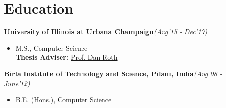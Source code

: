\section{\mysidestyle Education}
\vspace{0mm}
\textbf{\href{https://cs.illinois.edu/}{University of Illinois at Urbana Champaign}}\hfill {\small\textit{(Aug'15 - Dec'17)}}
\begin{itemize}[leftmargin=*]\compresslist
    \item[]M.S., Computer Science 
    \\
\textbf{Thesis Adviser:} \href{http://www.cis.upenn.edu/~danroth/}{Prof. Dan Roth}
\end{itemize}
\vspace{-0.2cm}
\textbf{\href{http://www.bits-pilani.ac.in/}{Birla Institute of Technology and Science, Pilani, India}}\hfill{\small\textit{(Aug'08 - June'12)}}
\begin{itemize}[leftmargin=*]\compresslist
    \item[]B.E. (Hons.), Computer Science %
\end{itemize}